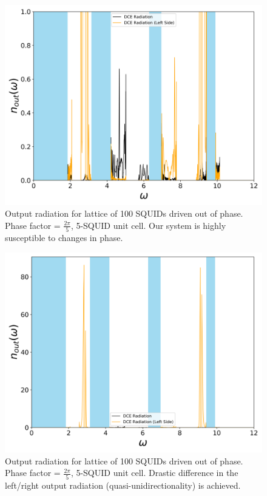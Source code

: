 \begin{figure}[h]
    \includegraphics[width=\textwidth, keepaspectratio]{figures/results/phase_shift_2pi_5_both_zoom.png}
    \caption{Output radiation for lattice of 100 SQUIDs driven out of phase. Phase factor = $\frac{2\pi}{5}$, 5-SQUID unit cell. Our system is highly susceptible to changes in phase.}
    \label{fig:phase_2pi_5_both}
\end{figure}
\clearpage
%
\begin{figure}[h]
    \includegraphics[width=\textwidth, keepaspectratio]{figures/results/phase_shift_2pi_5_both.png}
    \caption{Output radiation for lattice of 100 SQUIDs driven out of phase. Phase factor = $\frac{2\pi}{5}$, 5-SQUID unit cell. Drastic difference in the left/right output radiation (quasi-unidirectionality) is achieved.}
    \label{fig:phase_2pi_5_both_zoomed}
\end{figure}
\clearpage
